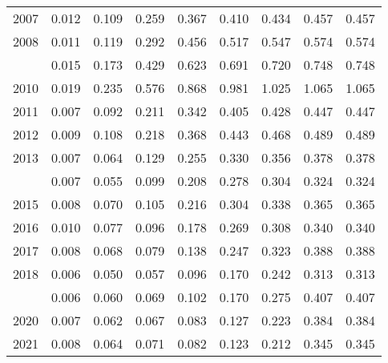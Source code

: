 \documentclass[
]{article}
\begin{document}
\begin{longtable}[t]{lrrrrrrrr}
2007 & 0.012 & 0.109 & 0.259 & 0.367 & 0.410 & 0.434 & 0.457 & 0.457\\
2008 & 0.011 & 0.119 & 0.292 & 0.456 & 0.517 & 0.547 & 0.574 & 0.574\\
\addlinespace
2009 & 0.015 & 0.173 & 0.429 & 0.623 & 0.691 & 0.720 & 0.748 & 0.748\\
2010 & 0.019 & 0.235 & 0.576 & 0.868 & 0.981 & 1.025 & 1.065 & 1.065\\
2011 & 0.007 & 0.092 & 0.211 & 0.342 & 0.405 & 0.428 & 0.447 & 0.447\\
2012 & 0.009 & 0.108 & 0.218 & 0.368 & 0.443 & 0.468 & 0.489 & 0.489\\
2013 & 0.007 & 0.064 & 0.129 & 0.255 & 0.330 & 0.356 & 0.378 & 0.378\\
\addlinespace
2014 & 0.007 & 0.055 & 0.099 & 0.208 & 0.278 & 0.304 & 0.324 & 0.324\\
2015 & 0.008 & 0.070 & 0.105 & 0.216 & 0.304 & 0.338 & 0.365 & 0.365\\
2016 & 0.010 & 0.077 & 0.096 & 0.178 & 0.269 & 0.308 & 0.340 & 0.340\\
2017 & 0.008 & 0.068 & 0.079 & 0.138 & 0.247 & 0.323 & 0.388 & 0.388\\
2018 & 0.006 & 0.050 & 0.057 & 0.096 & 0.170 & 0.242 & 0.313 & 0.313\\
\addlinespace
2019 & 0.006 & 0.060 & 0.069 & 0.102 & 0.170 & 0.275 & 0.407 & 0.407\\
2020 & 0.007 & 0.062 & 0.067 & 0.083 & 0.127 & 0.223 & 0.384 & 0.384\\
2021 & 0.008 & 0.064 & 0.071 & 0.082 & 0.123 & 0.212 & 0.345 & 0.345\\*
\end{longtable}
\end{document}
